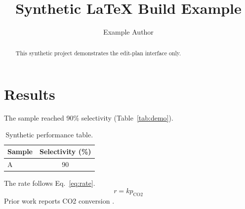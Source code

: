 \documentclass[11pt]{article}
\title{Synthetic LaTeX Build Example}
\author{Example Author}
\begin{document}
\maketitle
\begin{abstract}
This synthetic project demonstrates the edit-plan interface only.
\end{abstract}
\section{Results}
The sample reached 90\% selectivity (Table~\ref{tab:demo}).
\begin{table}[htbp]
\centering
\begin{tabular}{lc}
\toprule
Sample & Selectivity (\%) \\
\midrule
A & 90 \\
\bottomrule
\end{tabular}
\caption{Synthetic performance table.}
\end{table}
The rate follows Eq.~\ref{eq:rate}.
\begin{equation}
r = k p_{\mathrm{CO2}}
\label{eq:rate}
\end{equation}
Prior work reports CO2 conversion \citep{doe2024}.


\end{document}
